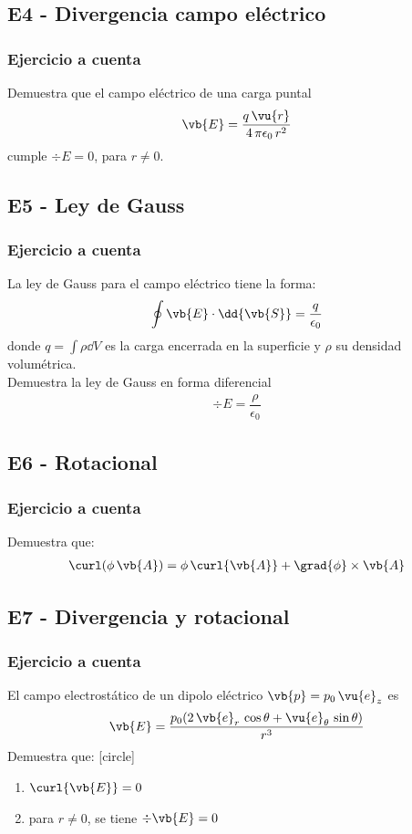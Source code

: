 \subsection{E4 - Divergencia campo eléctrico}
\begin{frame}
\frametitle{Ejercicio a cuenta}
Demuestra que el campo eléctrico de una carga puntal
\begin{align*}
\vb{E} = \dfrac{q \, \vu{r}}{4 \, \pi \epsilon_{0} \, r^{2}}
\end{align*}
cumple $\div{E} = 0$, para $r \neq 0$.
\end{frame}
\subsection{E5 - Ley de Gauss}
\begin{frame}
\frametitle{Ejercicio a cuenta}
La ley de Gauss para el campo eléctrico tiene la forma:
\begin{align*}
\oint \vb{E} \cdot \dd{\vb{S}} = \dfrac{q}{\epsilon_{0}}
\end{align*}
donde $q = \displaystyle \int \rho \dd{V}$ es la carga encerrada en la superficie y $\rho$ su densidad volumétrica.
\\
\bigskip
Demuestra la ley de Gauss en forma diferencial
\begin{align*}
\div{E} = \dfrac{\rho}{\epsilon_{0}}
\end{align*}
\end{frame}
\subsection{E6 - Rotacional}
\begin{frame}
\frametitle{Ejercicio a cuenta}
Demuestra que:
\begin{align*}
\curl(\phi \, \vb{A}) = \phi \, \curl{\vb{A}} + \grad{\phi} \times \vb{A}
\end{align*}
\end{frame}
\subsection{E7 - Divergencia y rotacional}
\begin{frame}
\frametitle{Ejercicio a cuenta}
El campo electrostático de un dipolo eléctrico $\vb{p} = p_{0} \, \vu{e}_{z}$ es
\begin{align*}
\vb{E} = \dfrac{p_{0} (2 \, \vb{e}_{r} \, \cos \theta + \vu{e}_{\theta} \, \sin \theta)}{r^{3}}
\end{align*}
Demuestra que:
[circle]
\begin{enumerate}
\item $\curl{\vb{E}} = 0$
\item para $r \neq 0$, se tiene $\div{\vb{E}} = 0$
\end{enumerate}
\end{frame}
